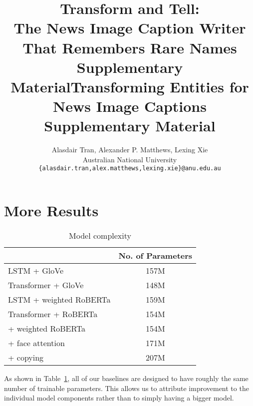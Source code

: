 \documentclass[10pt,twocolumn,letterpaper]{article}
\begin{document}
\title{Transform and Tell:\\The News Image Caption Writer That Remembers Rare Names\\Supplementary Material}
\title{Transforming Entities for News Image Captions\\Supplementary Material}

\author{Alasdair Tran, Alexander P. Matthews, Lexing Xie\\
Australian National University\\
{\tt\small \{alasdair.tran,alex.matthews,lexing.xie\}@anu.edu.au}
}

\maketitle

\section{More Results}

\begin{table}[t]
	\caption {Model complexity}
	\label{tab:models}
	\centering
	\begin{tabularx}{\linewidth}{Xc}
		\toprule
        & No. of Parameters \\
      \midrule
      LSTM + GloVe & 157M \\
      Transformer + GloVe & 148M \\
      LSTM + weighted RoBERTa & 159M \\
      \midrule
      Transformer + RoBERTa & 154M \\
      \quad + weighted RoBERTa & 154M \\
      \quad\quad + face attention & 171M \\
      \quad\quad\quad + copying & 207M \\
		\bottomrule
	\end{tabularx}
\end{table}

As shown in Table~\ref{tab:models}, all of our baselines are designed to have
roughly the same number of trainable parameters. This allows us to attribute
improvement to the individual model components rather than to simply having a
bigger model.
\end{document}
